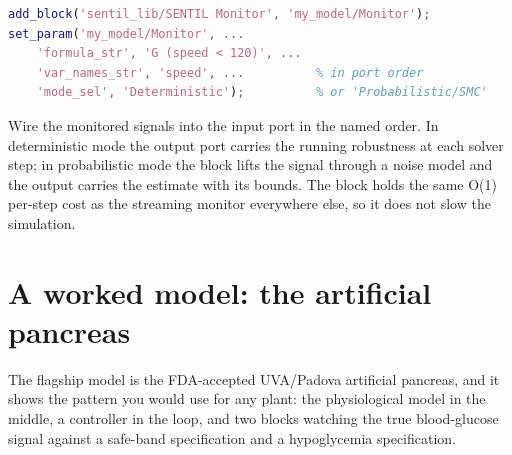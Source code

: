 \begin{lstlisting}[language=Matlab]
add_block('sentil_lib/SENTIL Monitor', 'my_model/Monitor');
set_param('my_model/Monitor', ...
    'formula_str', 'G (speed < 120)', ...
    'var_names_str', 'speed', ...          % in port order
    'mode_sel', 'Deterministic');          % or 'Probabilistic/SMC'
\end{lstlisting}

Wire the monitored signals into the input port in the named order. In deterministic mode the output port carries the running robustness at each solver step; in probabilistic mode the block lifts the signal through a noise model and the output carries the estimate with its bounds. The block holds the same O(1) per-step cost as the streaming monitor everywhere else, so it does not slow the simulation.

\section{A worked model: the artificial pancreas}

The flagship model is the FDA-accepted UVA/Padova artificial pancreas, and it shows the pattern you would use for any plant: the physiological model in the middle, a controller in the loop, and two  blocks watching the true blood-glucose signal against a safe-band specification and a hypoglycemia specification.

